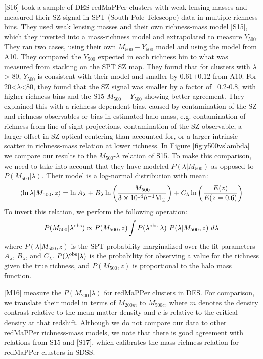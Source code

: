 \documentclass[a4paper,fleqn,usenatbib]{mnras}
\begin{document}
\cite{2016arXiv160508770S} [S16] took a sample of DES redMaPPer clusters with weak lensing masses and measured their SZ signal in SPT (South Pole Telescope) data in multiple richness bins. They used weak lensing masses and their own richness-mass model \citep{2015MNRAS.454.2305S} [S15], which they inverted into a mass-richness model and extrapolated to measure $Y_{500}$. They ran two cases, using their own $M_{500} - Y_{500}$ model and using the model from A10. They compared the $Y_{500}$ expected in each richness bin to what was measured from stacking on the SPT SZ map. They found that for clusters with $\lambda$ > 80, $Y_{500}$ is consistent with their model and smaller by 0.61$\pm$0.12 from A10. For 20<$\lambda$<80, they found that the SZ signal was smaller by a factor of ~0.2-0.8, with higher richness bins and the S15 $M_{500} - Y_{500}$ showing better agreement. They explained this with a richness dependent bias, caused by contamination of the SZ and richness observables or bias in estimated halo mass, e.g. contamination of richness from line of sight projections, contamination of the SZ observable, a larger offset in SZ-optical centering than accounted for, or a larger intrinsic scatter in richness-mass relation at lower richness.
In Figure \ref{fig:y500vslambda} we compare our results to the $M_{500}$-$\lambda$ relation of S15. To make this comparison, we need to take into account that they have modeled $P(\lambda|M_{500})$ as opposed to $P(M_{500}|\lambda)$. Their model is a log-normal distribution with mean:
\begin{equation}
\langle \ln\lambda | M_{500},z\rangle = \ln A_{\lambda} + B_{\lambda} \ln\bigg(\frac{M_{500}}{3 \times 10^{14}h^{-1}\rm M_{\odot}}\bigg) + C_{\lambda}\ln\bigg(\frac{E(z)}{E(z=0.6)}\bigg)
\end{equation}
To invert this relation, we perform the following operation:
\begin{equation}
P(M_{500}|\lambda^{\rm obs}) \propto P(M_{500},z) \int P(\lambda^{\rm obs}|\lambda) \  P(\lambda|M_{500},z) \ d\lambda
\end{equation}
where $P(\lambda|M_{500},z)$ is the SPT probability marginalized over the fit parameters $A_{\lambda}$, $B_{\lambda}$, and $C_{\lambda}$. $P(\lambda^{\rm obs}|\lambda)$ is the probability for observing a value for the richness given the true richness, and $P(M_{500},z)$ is proportional to the halo mass function. 


\cite{2016arXiv161006890M} [M16] measure the $P(M_{200}|\lambda)$ for redMaPPer clusters in DES. For comparison, we translate their model in terms of $M_{200m}$ to $M_{500c}$, where $m$ denotes the density contrast relative to the mean matter density and $c$ is relative to the critical density at that redshift. Although we do not compare our data to other redMaPPer richness-mass models, we note that there is good agreement with relations from S15 and \cite{2017MNRAS.466.3103S} [S17], which calibrates the mass-richness relation for redMaPPer clusters in SDSS.
\end{document}
